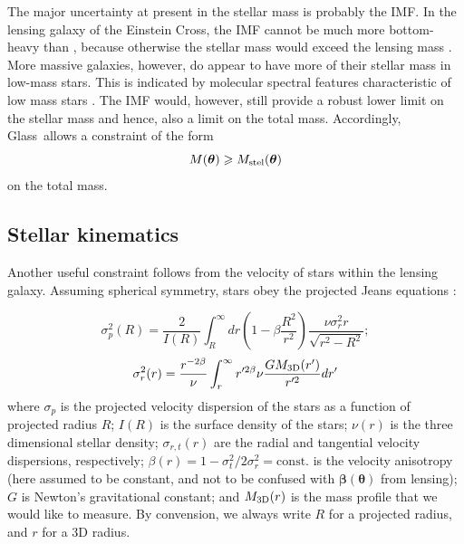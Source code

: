 \documentclass[galley,usenatbib]{mn2e}
\newcommand{\Glass}{{\sc Glass}}
\renewcommand{\vec}[1]{\ensuremath{\boldsymbol{#1}}}
\begin{document}
The major uncertainty at present in the stellar mass is probably the
IMF.  In the lensing galaxy of the Einstein Cross, the IMF cannot be
much more bottom-heavy than \cite{2003PASP..115..763C}, because
otherwise the stellar mass would exceed the lensing mass
\cite{2010MNRAS.409L..30F}.  More massive galaxies, however, do appear
to have more of their stellar mass in low-mass stars.  This is
indicated by molecular spectral features characteristic of low mass
stars
\citep{2004ApJ...614L.101C,2012ApJ...747...69C,2013MNRAS.429L..15F}.
The \cite{2003PASP..115..763C} IMF would, however, still provide a robust
lower limit on the stellar mass and hence, also a limit on the total
mass.  Accordingly, \Glass\ allows a constraint of the form
\begin{equation} 
M(\vec\theta) \geq M_{\rm stel}(\vec\theta)
\end{equation} 
on the total mass.

\subsection{Stellar kinematics}\label{sec:kinematics} 

Another useful constraint follows from the velocity of stars within the lensing
galaxy. Assuming spherical symmetry, stars obey the projected Jeans equations
\citep[e.g.][]{2008gady.book.....B}: 

\begin{equation}
\sigma_p^2(R) = \frac{2}{I(R)}\int_R^\infty dr \left(1-\beta \frac{R^2}{r^2}\right) \frac{\nu \sigma_r^2 r}{\sqrt{r^2 - R^2}};
\label{eqn:sphericaljeans}
\end{equation}
\begin{equation} 
\sigma_r^2(r) = \frac{r^{-2\beta}}{\nu}\int_r^\infty r'^{2\beta} \nu \frac{GM_{\rm 3D}(r')}{r'^2}dr'
\end{equation} 
where $\sigma_p$ is the projected velocity dispersion of the stars as a
function of projected radius $R$; $I(R)$ is the surface density of the stars;
$\nu(r)$ is the three dimensional stellar density; $\sigma_{r,t}(r)$ are the
radial and tangential velocity dispersions, respectively; $\beta(r) = 1 -
\sigma_t^2/2\sigma_r^2 = \mathrm{const.}$ is the velocity anisotropy (here
assumed to be constant, and not to be confused with $\vec\beta(\vec\theta)$ from
lensing); $G$ is Newton's gravitational constant; and $M_{\rm 3D}(r)$ is
the mass profile that we would like to measure. By convension, we always write $R$ 
for a projected radius, and $r$ for a 3D radius.
\end{document}
